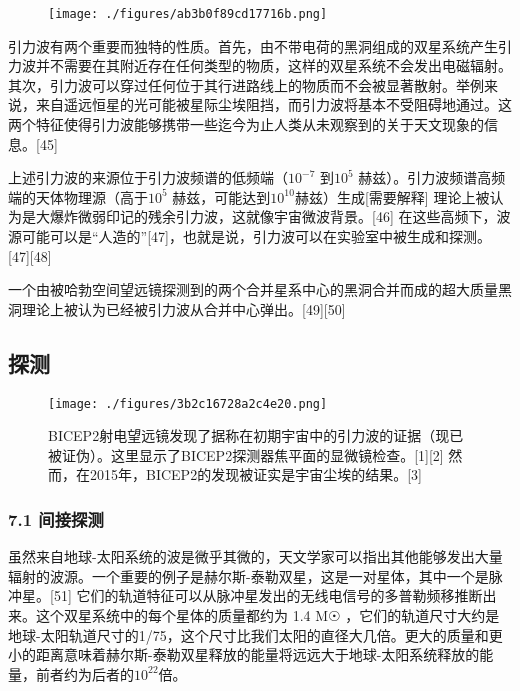 \begin{figure}[ht]
\centering
\texttt{[image: ./figures/ab3b0f89cd17716b.png]}
\caption \label{fig_YLB_8}
\end{figure}

引力波有两个重要而独特的性质。首先，由不带电荷的黑洞组成的双星系统产生引力波并不需要在其附近存在任何类型的物质，这样的双星系统不会发出电磁辐射。其次，引力波可以穿过任何位于其行进路线上的物质而不会被显著散射。举例来说，来自遥远恒星的光可能被星际尘埃阻挡，而引力波将基本不受阻碍地通过。这两个特征使得引力波能够携带一些迄今为止人类从未观察到的关于天文现象的信息。[45]

上述引力波的来源位于引力波频谱的低频端（$10^{-7}$ 到$10^{5}$ 赫兹）。引力波频谱高频端的天体物理源（高于$10^{5}$ 赫兹，可能达到$10^{10}$赫兹）生成[需要解释] 理论上被认为是大爆炸微弱印记的残余引力波，这就像宇宙微波背景。[46] 在这些高频下，波源可能可以是“人造的”[47]，也就是说，引力波可以在实验室中被生成和探测。[47][48]

一个由被哈勃空间望远镜探测到的两个合并星系中心的黑洞合并而成的超大质量黑洞理论上被认为已经被引力波从合并中心弹出。[49][50]

\subsection{探测}

\begin{figure}[ht]
\centering
\texttt{[image: ./figures/3b2c16728a2c4e20.png]}
\caption{BICEP2射电望远镜发现了据称在初期宇宙中的引力波的证据（现已被证伪）。这里显示了BICEP2探测器焦平面的显微镜检查。[1][2] 然而，在2015年，BICEP2的发现被证实是宇宙尘埃的结果。[3]} \label{fig_YLB_9}
\end{figure}

\subsubsection{7.1 间接探测}

虽然来自地球-太阳系统的波是微乎其微的，天文学家可以指出其他能够发出大量辐射的波源。一个重要的例子是赫尔斯-泰勒双星，这是一对星体，其中一个是脉冲星。[51] 它们的轨道特征可以从脉冲星发出的无线电信号的多普勒频移推断出来。这个双星系统中的每个星体的质量都约为 1.4 M☉ ，它们的轨道尺寸大约是地球-太阳轨道尺寸的1/75，这个尺寸比我们太阳的直径大几倍。更大的质量和更小的距离意味着赫尔斯-泰勒双星释放的能量将远远大于地球-太阳系统释放的能量，前者约为后者的$10^{22}$倍。

